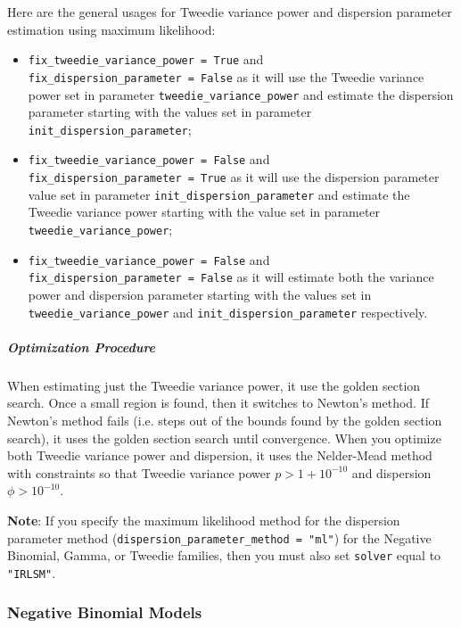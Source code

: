 Here are the general usages for Tweedie variance power and dispersion parameter estimation using maximum likelihood:
\begin{itemize}
\item \texttt{fix\_tweedie\_variance\_power = True} and \\ \texttt{fix\_dispersion\_parameter = False} as it will use the Tweedie variance power set in parameter \texttt{tweedie\_variance\_power} and estimate the dispersion parameter starting with the values set in parameter \texttt{init\_dispersion\_parameter};
\item  \texttt{fix\_tweedie\_variance\_power = False} and \\ \texttt{fix\_dispersion\_parameter = True} as it will use the dispersion parameter value set in parameter \texttt{init\_dispersion\_parameter} and estimate the Tweedie variance power starting with the value set in parameter \texttt{tweedie\_variance\_power};
\item \texttt{fix\_tweedie\_variance\_power = False} and \\ \texttt{fix\_dispersion\_parameter = False} as it will estimate both the variance power and dispersion parameter starting with the values set in \\ \texttt{tweedie\_variance\_power} and \texttt{init\_dispersion\_parameter} respectively.
\end{itemize}

\subparagraph{Optimization Procedure}

When estimating just the Tweedie variance power, it use the golden section search. Once a small region is found, then it switches to Newton's method. If Newton's method fails (i.e. steps out of the bounds found by the golden section search), it uses the golden section search until convergence. When you optimize both Tweedie variance power and dispersion, it uses the Nelder-Mead method with constraints so that Tweedie variance power $p>1+10^{-10}$ and dispersion $\phi >10^{-10}$.

\textbf{Note}: If you specify the maximum likelihood method for the dispersion parameter method (\texttt{dispersion\_parameter\_method = "ml"}) for the Negative Binomial, Gamma, or Tweedie families, then you must also set \texttt{solver} equal to \texttt{"IRLSM"}.
   
\subsubsection{Negative Binomial Models}

